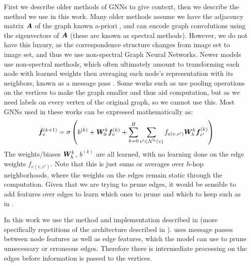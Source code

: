 \documentclass{article} %
\begin{document}
First we describe older methods of GNNs to give context, then we describe the method we use in this work.
Many older methods assume we have the adjacency matrix ${\bm{A}}$ of the graph known a-priori \cite{bruna2013spectral}, and can encode graph convolutions using the eigenvectors of ${\bm{A}}$ (these are known as spectral methods).
However, we do not have this luxury, as the correspondence structure changes from image set to image set, and thus we use non-spectral Graph Neural Networks.
Newer models use non-spectral methods, which often ultimately amount to transforming each node with learned weights then averaging each node's representation with its neighbors, known as a message pass \citep{kipf2017semi, defferrard2016convolutional, gama2018mimo, gama2018convolutional}.
Some works such as \cite{gama2019convolutional} use pooling operations on the vertices to make the graph smaller and thus aid computation, but as we need labels on every vertex of the original graph, so we cannot use this.
Most GNNs used in these works can be expressed mathematically as:
\begin{align*}
\tilde{{\bm{f}}}_v^{(k+1)} =&\; \sigma\left( b^{(k)} + {\bm{W}}_0^{k} {\bm{f}}_{v}^{(k)} + \sum_{h=0}^H \sum_{v' \in \mathcal{N}^{h}(v)} f_{e(v,v')} {\bm{W}}_{h}^{k} {\bm{f}}_{v'}^{(k)} \right) \\
\end{align*}
The weights/biases ${\bm{W}}_{h}^{k}$, $b^{(k)}$ are all learned, with no learning done on the edge weights $f_{e(v,v')}$. 
Note that this is just sums or averages over $h$-hop neighborhoods, where the weights on the edges remain static through the computation.
Given that we are trying to prune edges, it would be sensible to add features over edges to learn which ones to prune and which to keep such as in \cite{scarselli2009graph}.

In this work we use the method and implementation described in \cite{battaglia2018relational} (more specifically repetitions of the architecture described in \cite{battaglia2016interaction}).
\cite{battaglia2018relational} uses message passes between node features as well as edge features, which the model can use to prune unnecessary or erroneous edges.
Therefore there is intermediate processing on the edges before information is passed to the vertices. 
\end{document}
